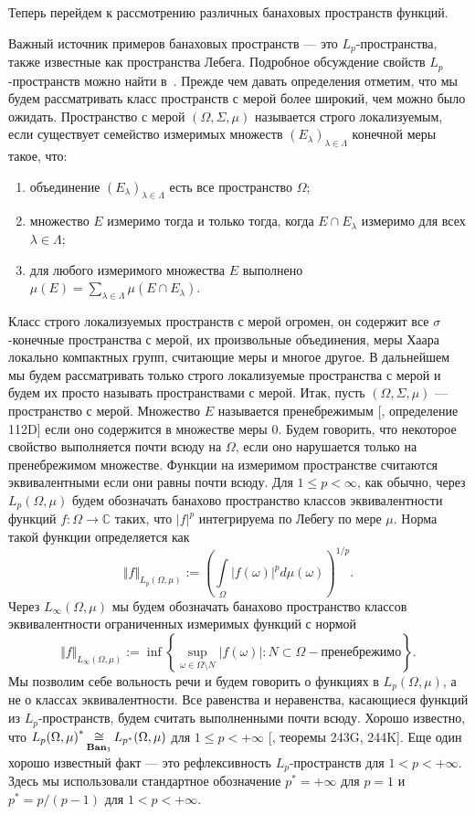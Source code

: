 Теперь перейдем к рассмотрению различных банаховых пространств функций.

Важный источник примеров банаховых пространств --- это $L_p$-пространства, также
известные как пространства Лебега. Подробное обсуждение свойств
$L_p$-пространств можно найти в~\cite{CarothShortCourseBanSp}. Прежде чем давать
определения отметим, что мы будем рассматривать класс пространств с мерой более
широкий, чем можно было ожидать. Пространство с мерой $(\Omega,\Sigma,\mu)$
называется строго локализуемым, если существует семейство измеримых множеств
${(E_\lambda)}_{\lambda\in\Lambda}$ конечной меры такое, что: 
\begin{enumerate} 
    \item объединение ${(E_\lambda)}_{\lambda\in\Lambda}$ есть все пространство
    $\Omega$; 

    \item множество $E$ измеримо тогда и только тогда, когда $E\cap E_\lambda$
    измеримо для всех $\lambda\in\Lambda$; 

    \item для любого измеримого множества $E$ выполнено
    $\mu(E)=\sum_{\lambda\in\Lambda}\mu(E\cap E_\lambda)$. 
\end{enumerate}

\noindent
Класс строго локализуемых пространств с мерой огромен, он содержит все
$\sigma$-конечные пространства с мерой, их произвольные объединения, меры Хаара
локально компактных групп, считающие меры и многое другое. В дальнейшем мы будем
рассматривать только строго локализуемые пространства с мерой и будем их просто
называть пространствами с мерой. Итак, пусть $(\Omega,\Sigma,\mu)$ ---
пространство с мерой. Множество $E$ называется пренебрежимым [\cite{FremMeasTh},
определение 112D] если оно содержится в множестве меры $0$. Будем говорить, что
некоторое свойство выполняется почти всюду на $\Omega$, если оно нарушается
только на пренебрежимом множестве. Функции на измеримом пространстве считаются
эквивалентными если они равны почти всюду. Для $1\leq p <\infty$, как обычно,
через $L_p(\Omega,\mu)$ будем обозначать банахово пространство классов
эквивалентности функций $f:\Omega\to\mathbb{C}$ таких, что $|f|^p$ интегрируема
по Лебегу по мере $\mu$. Норма такой функции определяется как 
$$
\Vert f\Vert_{L_p(\Omega,\mu)}
:={\left(
    \int\limits_{\Omega}{|f(\omega)|}^p d\mu(\omega)
\right)}^{1/p}.
$$ 
Через $L_\infty(\Omega,\mu)$ мы будем обозначать банахово пространство классов
эквивалентности ограниченных измеримых функций с нормой 
$$
\Vert f\Vert_{L_\infty(\Omega,\mu)}
:=\inf\left \{
    \sup_{\omega\in\Omega\setminus N}|f(\omega)|
    :N\subset\Omega - \mbox{пренебрежимо}
\right \}.
$$ 
Мы позволим себе вольность речи и будем говорить о функциях в $L_p(\Omega,\mu)$,
а не о классах эквивалентности. Все равенства и неравенства, касающиеся функций
из  $L_p$-пространств, будем считать выполненными почти всюду. Хорошо известно,
что ${L_p(\Omega,\mu)}^*\mathop{\mathbin{\cong}}\limits_{\mathbf{Ban}_1}L_{p^*}(\Omega,\mu)$ для $1\leq
p<+\infty$ [\cite{FremMeasTh}, теоремы 243G, 244K]. Еще один хорошо известный
факт  --- это рефлексивность $L_p$-пространств для $1<p<+\infty$. Здесь мы
использовали стандартное обозначение $p^*=+\infty$ для $p=1$ и $p^*=p/(p-1)$ для
$1<p<+\infty$.

